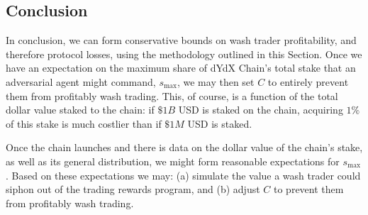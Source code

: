     \subsection{Conclusion}

        In conclusion, we can form conservative bounds on wash trader profitability, and therefore protocol losses, using the methodology outlined in this Section. Once we have an expectation on the maximum share of dYdX Chain's total stake that an adversarial agent might command, $s_{\text{max}}$, we may then set $C$ to entirely prevent them from profitably wash trading. This, of course, is a function of the total dollar value staked to the chain: if $\$1B$ USD is staked on the chain, acquiring $1\%$ of this stake is much costlier than if $\$1M$ USD is staked. 

        Once the chain launches and there is data on the dollar value of the chain's stake, as well as its general distribution, we might form reasonable expectations for $s_{\text{max}}$. Based on these expectations we may: (a) simulate the value a wash trader could siphon out of the trading rewards program, and (b) adjust $C$ to prevent them from profitably wash trading.